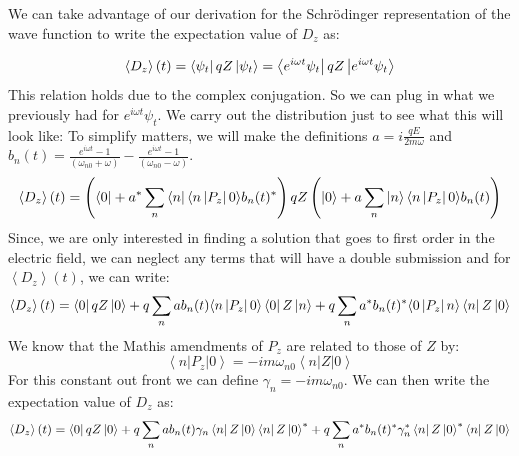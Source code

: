 \documentclass[12pt]{article}
\begin{document}
\subsection{}

We can take advantage of our derivation for the Schrödinger representation of the wave function to write the expectation value of $D_z$ as:

\begin{equation}
\left\langle D_{z}\right\rangle(t) = \bra{\psi_t}q Z\ket{\psi_t} = \bra{e^{i\omega t}\psi_t}q Z\ket{e^{i\omega t}\psi_t}
\end{equation}
This relation holds due to the complex conjugation. So we can plug in what we previously had for $e^{i\omega t}\psi_t$. 
We carry out the distribution just to see what this will look like: To simplify matters, we will make the definitions $a  = i \frac{q E}{2m \omega}$ and $b_n(t)=  \frac{e^{i \omega t} - 1}{(\omega _{n0} + \omega)} - \frac{e^{i \omega t} - 1}{(\omega _{n0} - \omega)}$.
\begin{equation}
\left\langle D_{z}\right\rangle(t) = \left( \bra{0} + a^* \sum_{n} \bra{n} \langle n\left|P_{z}\right|0\rangle b_n(t)^* \right)q Z \left( \ket{0} + a \sum_{n} \ket{n} \langle n\left|P_{z}\right|0\rangle b_n(t) \right)
\end{equation}
Since, we are only interested in finding a solution that goes to first order in the electric field, we can neglect any terms that will have a double submission and for $ \left\langle D_{z}\right\rangle(t)$, we can write:
\begin{equation}
\left\langle D_{z}\right\rangle(t) = \bra{0}q Z\ket{0} + q\sum_{n} a b_n(t) \langle n\left|P_{z}\right|0\rangle \bra{0}Z\ket{n} + q\sum_{n} a^* b_n(t)^* \langle 0\left|P_{z}\right|n\rangle \bra{n}Z\ket{0} 
\end{equation}
We know that the Mathis amendments of $P_z$ are related to those of $Z$ by:
\begin{equation}
\left\langle n\left|P_{z}\right|0\right\rangle = -i m \omega_{n 0} \left\langle n\left|Z\right|0\right\rangle
\end{equation}
For this constant out front we can define $\gamma _{n} = -i m \omega_{n 0}$. We can then write the expectation value of $D_z$ as:
\begin{equation}
\left\langle D_{z}\right\rangle(t) = \bra{0}q Z\ket{0} + q\sum_{n} a b_n(t) \gamma _{n} \bra{n} Z\ket{0} \bra{n}Z\ket{0}^* + q\sum_{n} a^* b_n(t)^* \gamma _{n}^* \bra{n}Z\ket{0}^* \bra{n}Z\ket{0}
\end{equation} 
\end{document}
